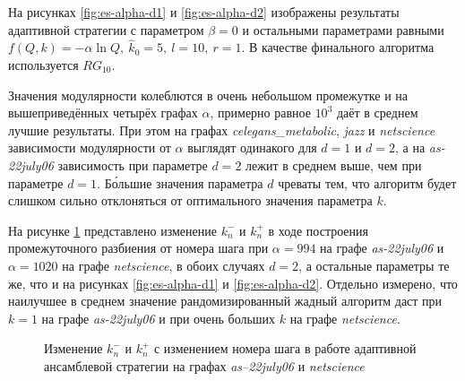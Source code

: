 На рисунках \ref{fig:es-alpha-d1} и \ref{fig:es-alpha-d2} изображены результаты адаптивной стратегии с параметром $\beta = 0$ и остальными параметрами равными $f(Q, k) = -\alpha \ln Q,\ \hat{k}_0 = 5,\ l = 10,\ r = 1$. В качестве финального алгоритма используется $RG_{10}$.

Значения модулярности колеблются в очень небольшом промежутке и на вышеприведённых четырёх графах $\alpha$, примерно равное $10^3$ даёт в среднем лучшие результаты. При этом на графах \emph{celegans\_metabolic}, \emph{jazz} и \emph{netscience} зависимости модулярности от $\alpha$ выглядят одинакого для $d = 1$ и $d = 2$, а на \emph{as-22july06} зависимость при параметре $d = 2$ лежит в среднем выше, чем при параметре $d = 1$. Б\'{о}льшие значения параметра $d$ чреваты тем, что алгоритм будет слишком сильно отклоняться от оптимального значения параметра $k$.

На рисунке \ref{fig:es-alpha-d3} представлено изменение $k^{-}_n$ и $k^{+}_n$ в ходе построения промежуточного разбиения от номера шага при $\alpha = 994$ на графе \emph{as-22july06} и $\alpha = 1020$ на графе \emph{netscience}, в обоих случаях $d = 2$, а остальные параметры те же, что и на рисунках \ref{fig:es-alpha-d1} и \ref{fig:es-alpha-d2}. Отдельно измерено, что наилучшее в среднем значение рандомизированный жадный алгоритм даст при $k = 1$ на графе \emph{as-22july06} и при очень больших $k$ на графе \emph{netscience}.

\begin{figure}[H]
	\columnwidth
	\caption{Изменение $k^{-}_n$ и $k^{+}_n$ с изменением номера шага в работе адаптивной ансамблевой стратегии на графах \emph{as--22july06} и \emph{netscience}}
	\label{fig:es-alpha-d3}
\end{figure}

